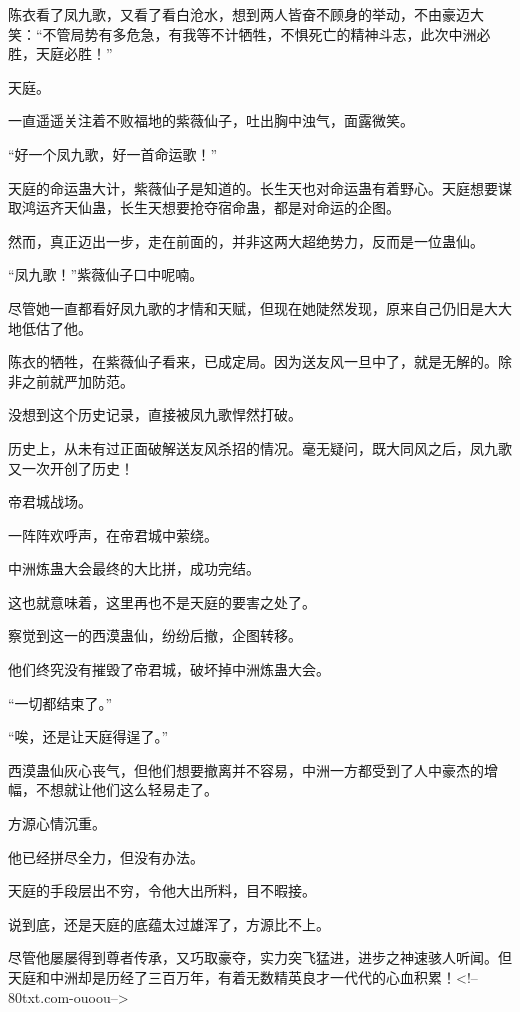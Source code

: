 \begin{this_body}
陈衣看了凤九歌，又看了看白沧水，想到两人皆奋不顾身的举动，不由豪迈大笑：“不管局势有多危急，有我等不计牺牲，不惧死亡的精神斗志，此次中洲必胜，天庭必胜！”

天庭。

一直遥遥关注着不败福地的紫薇仙子，吐出胸中浊气，面露微笑。

“好一个凤九歌，好一首命运歌！”

天庭的命运蛊大计，紫薇仙子是知道的。长生天也对命运蛊有着野心。天庭想要谋取鸿运齐天仙蛊，长生天想要抢夺宿命蛊，都是对命运的企图。

然而，真正迈出一步，走在前面的，并非这两大超绝势力，反而是一位蛊仙。

“凤九歌！”紫薇仙子口中呢喃。

尽管她一直都看好凤九歌的才情和天赋，但现在她陡然发现，原来自己仍旧是大大地低估了他。

陈衣的牺牲，在紫薇仙子看来，已成定局。因为送友风一旦中了，就是无解的。除非之前就严加防范。

没想到这个历史记录，直接被凤九歌悍然打破。

历史上，从未有过正面破解送友风杀招的情况。毫无疑问，既大同风之后，凤九歌又一次开创了历史！

帝君城战场。

一阵阵欢呼声，在帝君城中萦绕。

中洲炼蛊大会最终的大比拼，成功完结。

这也就意味着，这里再也不是天庭的要害之处了。

察觉到这一的西漠蛊仙，纷纷后撤，企图转移。

他们终究没有摧毁了帝君城，破坏掉中洲炼蛊大会。

“一切都结束了。”

“唉，还是让天庭得逞了。”

西漠蛊仙灰心丧气，但他们想要撤离并不容易，中洲一方都受到了人中豪杰的增幅，不想就让他们这么轻易走了。

方源心情沉重。

他已经拼尽全力，但没有办法。

天庭的手段层出不穷，令他大出所料，目不暇接。

说到底，还是天庭的底蕴太过雄浑了，方源比不上。

尽管他屡屡得到尊者传承，又巧取豪夺，实力突飞猛进，进步之神速骇人听闻。但天庭和中洲却是历经了三百万年，有着无数精英良才一代代的心血积累！<!--80txt.com-ouoou-->

\end{this_body}

